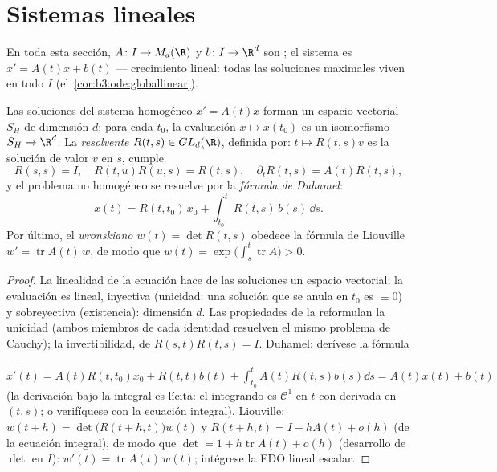 \section{Sistemas lineales}

En toda esta sección, $A \colon I \to M_d(\R)$ y $b
\colon I \to \R^d$ son ;
el sistema es $x' = A(t)x
+ b(t)$ --- crecimiento lineal: todas las
soluciones maximales viven en todo $I$
(el~\cref{cor:b3:ode:globallinear}).

\begin{theorem}[Estructura]\label{thm:b3:ode:linearstructure}
Las soluciones del sistema homogéneo $x' = A(t)x$ forman un espacio
vectorial $S_H$ de dimensión $d$; para cada $t_0$, la evaluación
$x \mapsto x(t_0)$ es un isomorfismo $S_H \to
\R^d$. La \emph{resolvente}
$R(t, s) \in GL_d(\R)$, definida por: $t \mapsto R(t,
s)v$ es la solución de valor $v$ en $s$, cumple
\[
R(s,s) = I,\quad R(t, u)R(u, s) = R(t, s),\quad
\partial_tR(t,s) = A(t)R(t,s),
\]
y el problema no homogéneo se resuelve por la \emph{fórmula de
Duhamel}:
\[
x(t) = R(t, t_0)\,x_0 + \int_{t_0}^{t}R(t, s)\,b(s)\,\dd s .
\]
Por último, el \emph{wronskiano} $w(t) = \det
R(t, s)$ obedece la fórmula de Liouville $w' =
\operatorname{tr}A(t)\,w$, de modo que $w(t) =
\exp\bigl(\int_s^t\operatorname{tr}A\bigr) > 0$.
\end{theorem}

\begin{proof}
La linealidad de la ecuación hace de las soluciones un espacio
vectorial; la evaluación es lineal, inyectiva (unicidad: una solución
que se anula en $t_0$ es $\equiv 0$) y sobreyectiva (existencia):
dimensión $d$. Las propiedades de la
 reformulan la unicidad
(ambos miembros de cada identidad resuelven el mismo problema de
Cauchy); la invertibilidad, de $R(s,t)R(t,s) = I$. Duhamel: derívese la
fórmula --- $x'(t) = A(t)R(t,t_0)x_0 + R(t,t)b(t) +
\int_{t_0}^tA(t)R(t,s)b(s)\dd s = A(t)x(t) + b(t)$ (la derivación bajo
la integral es lícita: el integrando es $\mathcal C^1$ en $t$ con
derivada  en $(t,s)$; o
verifíquese con la ecuación integral). Liouville:
$w(t + h) = \det\bigl(R(t+h, t)\bigr)w(t)$ y $R(t + h, t) =
I + hA(t) + o(h)$ (de la ecuación integral), de modo que $\det = 1
+ h\operatorname{tr}A(t) + o(h)$ (desarrollo de $\det$ en $I$):
$w'(t) = \operatorname{tr}A(t)\,w(t)$; intégrese la EDO lineal escalar.
\end{proof}

